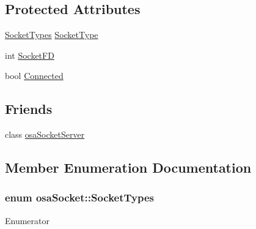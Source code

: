 \subsection*{Protected Attributes}
\begin{DoxyCompactItemize}
\item 
\hyperlink{classosa_socket_adeb99e6a5b2d4e503e0308ccb9677a00}{Socket\+Types} \hyperlink{classosa_socket_ac893ce4c18feac9b627df95993156482}{Socket\+Type}
\item 
int \hyperlink{classosa_socket_aa2b18a862994f6498868186a44d28793}{Socket\+F\+D}
\item 
bool \hyperlink{classosa_socket_ab44f88953d932cd97a9c772155d21e37}{Connected}
\end{DoxyCompactItemize}
\subsection*{Friends}
\begin{DoxyCompactItemize}
\item 
class \hyperlink{classosa_socket_abe48006d88cc6ef49f926f1eab169439}{osa\+Socket\+Server}
\end{DoxyCompactItemize}


\subsection{Member Enumeration Documentation}
\hypertarget{classosa_socket_adeb99e6a5b2d4e503e0308ccb9677a00}{}
\subsubsection[{Socket\+Types}]{\setlength{\rightskip}{0pt plus 5cm}enum {\bf osa\+Socket\+::\+Socket\+Types}}\label{classosa_socket_adeb99e6a5b2d4e503e0308ccb9677a00}
\begin{Desc}
\item[Enumerator]\par
\begin{description}
\item[{\em 
\hypertarget{classosa_socket_adeb99e6a5b2d4e503e0308ccb9677a00a30ff2c2d5d46158f56ac6d521629612a}{}U\+D\+P\label{classosa_socket_adeb99e6a5b2d4e503e0308ccb9677a00a30ff2c2d5d46158f56ac6d521629612a}
}]\item[{\em 
\hypertarget{classosa_socket_adeb99e6a5b2d4e503e0308ccb9677a00a285ce3d0ac4094f708fa3f7b2f222430}{}T\+C\+P\label{classosa_socket_adeb99e6a5b2d4e503e0308ccb9677a00a285ce3d0ac4094f708fa3f7b2f222430}
}]\end{description}
\end{Desc}


